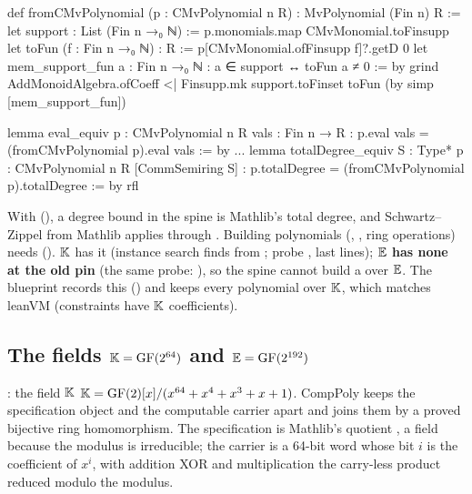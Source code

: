 \begin{leancode}
def fromCMvPolynomial  (p : CMvPolynomial n R) : MvPolynomial (Fin n) R :=
  let support : List (Fin n →₀ ℕ) := p.monomials.map CMvMonomial.toFinsupp
  let toFun (f : Fin n →₀ ℕ) : R := p[CMvMonomial.ofFinsupp f]?.getD 0
  let mem_support_fun {a : Fin n →₀ ℕ} : a ∈ support ↔ toFun a ≠ 0 := by grind
  AddMonoidAlgebra.ofCoeff <| Finsupp.mk support.toFinset toFun (by simp [mem_support_fun])
\end{leancode}



\begin{leancode}
lemma eval_equiv {p : CMvPolynomial n R} {vals : Fin n → R} :
    p.eval vals = (fromCMvPolynomial p).eval vals := by
...
lemma totalDegree_equiv {S : Type*} {p : CMvPolynomial n R} [CommSemiring S] :
    p.totalDegree = (fromCMvPolynomial p).totalDegree := by rfl
\end{leancode}


With  (), a
degree bound  in the spine is Mathlib's total degree, and
Schwartz--Zippel from Mathlib applies through . Building polynomials (,
, ring operations) needs \lean{[BEq R] [LawfulBEq R]} ().
$\mathbb{K}$ has it (instance search finds  from ; probe
, last lines); \textbf{$\mathbb{E}$ has none at the old pin} (the same probe:
), so the spine cannot build a  over
$\mathbb{E}$. The blueprint records this () and keeps every polynomial
over $\mathbb{K}$, which matches leanVM (constraints have $\mathbb{K}$ coefficients).

\subsection{The fields \texorpdfstring{$\mathbb{K} = \mathrm{GF}(2^{64})$}{K} and \texorpdfstring{$\mathbb{E} = \mathrm{GF}(2^{192})$}{E}}\label{sec:gen-lib-comppoly-fields}

\begin{define}{: the field $\mathbb{K}$}
$\mathbb{K} = \mathrm{GF}(2)[x]/(x^{64} + x^4 + x^3 + x + 1)$. CompPoly keeps the specification object
and the computable carrier apart and joins them by a proved bijective ring homomorphism. The
specification is Mathlib's quotient , a field because the modulus is
irreducible; the carrier is a 64-bit word whose bit $i$ is the coefficient of $x^i$, with
addition XOR and multiplication the carry-less product reduced modulo the modulus.
\end{define}

